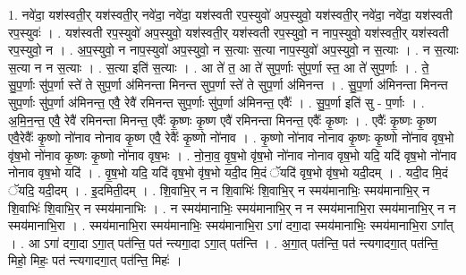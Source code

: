 \documentclass[17pt]{extarticle}
\begin{document}
1. नवे॑दा॒ यश॑स्वती॒र् यश॑स्वती॒र् नवे॑दा॒ नवे॑दा॒ यश॑स्वती रप॒स्युवो॑ अप॒स्युवो॒ यश॑स्वती॒र् नवे॑दा॒ नवे॑दा॒ यश॑स्वती रप॒स्युवः॑ । . यश॑स्वती रप॒स्युवो॑ अप॒स्युवो॒ यश॑स्वती॒र् यश॑स्वती रप॒स्युवो॒ न नाप॒स्युवो॒ यश॑स्वती॒र् यश॑स्वती रप॒स्युवो॒ न । . अ॒प॒स्युवो॒ न नाप॒स्युवो॑ अप॒स्युवो॒ न स॒त्याः स॒त्या नाप॒स्युवो॑ अप॒स्युवो॒ न स॒त्याः । . न स॒त्याः स॒त्या न न स॒त्याः । . स॒त्या इति॑ स॒त्याः । . आ ते॑ त॒ आ ते॑ सुप॒र्णाः सु॑प॒र्णा स्त॒ आ ते॑ सुप॒र्णाः । . ते॒ सु॒प॒र्णाः सु॑प॒र्णा स्ते॑ ते सुप॒र्णा अ॑मिनन्ता मिनन्त सुप॒र्णा स्ते॑ ते सुप॒र्णा अ॑मिनन्त । . सु॒प॒र्णा अ॑मिनन्ता मिनन्त सुप॒र्णाः सु॑प॒र्णा अ॑मिनन्त॒ एवै॒ रेवै॑ रमिनन्त सुप॒र्णाः सु॑प॒र्णा अ॑मिनन्त॒ एवैः᳚ । . सु॒प॒र्णा इति॑ सु - प॒र्णाः । . अ॒मि॒न॒न्त॒ एवै॒ रेवै॑ रमिनन्ता मिनन्त॒ एवैः᳚ कृ॒ष्णः कृ॒ष्ण एवै॑ रमिनन्ता मिनन्त॒ एवैः᳚ कृ॒ष्णः । . एवैः᳚ कृ॒ष्णः कृ॒ष्ण एवै॒रेवैः᳚ कृ॒ष्णो नो॑नाव नोनाव कृ॒ष्ण एवै॒ रेवैः᳚ कृ॒ष्णो नो॑नाव । . कृ॒ष्णो नो॑नाव नोनाव कृ॒ष्णः कृ॒ष्णो नो॑नाव वृष॒भो वृ॑ष॒भो नो॑नाव कृ॒ष्णः कृ॒ष्णो नो॑नाव वृष॒भः । . नो॒ना॒व॒ वृ॒ष॒भो वृ॑ष॒भो नो॑नाव नोनाव वृष॒भो यदि॒ यदि॑ वृष॒भो नो॑नाव नोनाव वृष॒भो यदि॑ । . वृ॒ष॒भो यदि॒ यदि॑ वृष॒भो वृ॑ष॒भो यदी॒द मि॒दं ॅयदि॑ वृष॒भो वृ॑ष॒भो यदी॒दम् । . यदी॒द मि॒दं ॅयदि॒ यदी॒दम् । . इ॒दमिती॒दम् । . शि॒वाभि॒र् न न शि॒वाभिः॑ शि॒वाभि॒र् न स्मय॑मानाभिः॒ स्मय॑मानाभि॒र् न शि॒वाभिः॑ शि॒वाभि॒र् न स्मय॑मानाभिः । . न स्मय॑मानाभिः॒ स्मय॑मानाभि॒र् न न स्मय॑मानाभि॒रा स्मय॑मानाभि॒र् न न स्मय॑मानाभि॒रा । . स्मय॑मानाभि॒रा स्मय॑मानाभिः॒ स्मय॑मानाभि॒रा ऽगा॑ दगा॒दा स्मय॑मानाभिः॒ स्मय॑मानाभि॒रा ऽगा᳚त् । . आ ऽगा॑ दगा॒दा ऽगा॒त् पत॑न्ति॒ पत॑ न्त्यगा॒दा ऽगा॒त् पत॑न्ति । . अ॒गा॒त् पत॑न्ति॒ पत॑ न्त्यगादगा॒त् पत॑न्ति॒ मिहो॒ मिहः॒ पत॑ न्त्यगादगा॒त् पत॑न्ति॒ मिहः॑ । \newline
\end{document}
